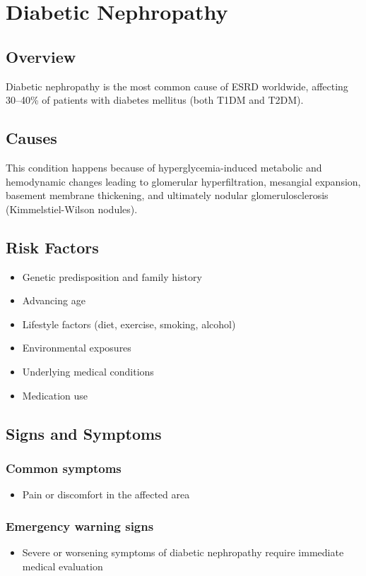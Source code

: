 \chapter{Diabetic Nephropathy}
\label{sec:Diabetic Nephropathy}

\section{Overview}
Diabetic nephropathy is the most common cause of ESRD worldwide, affecting 30--40\% of patients with diabetes mellitus (both T1DM and T2DM).
\section{Causes}
This condition happens because of hyperglycemia-induced metabolic and hemodynamic changes leading to glomerular hyperfiltration, mesangial expansion, basement membrane thickening, and ultimately nodular glomerulosclerosis (Kimmelstiel-Wilson nodules).     
\section{Risk Factors}

\begin{itemize}[noitemsep]
  \item Genetic predisposition and family history
  \item Advancing age
  \item Lifestyle factors (diet, exercise, smoking, alcohol)
  \item Environmental exposures
  \item Underlying medical conditions
  \item Medication use
\end{itemize}
\section{Signs and Symptoms}

\subsection{Common symptoms}
\begin{itemize}[noitemsep]
  \item Pain or discomfort in the affected area
  \end{itemize}

\subsection{Emergency warning signs}
\begin{itemize}[noitemsep]
  \item Severe or worsening symptoms of diabetic nephropathy require immediate medical evaluation
\end{itemize}
